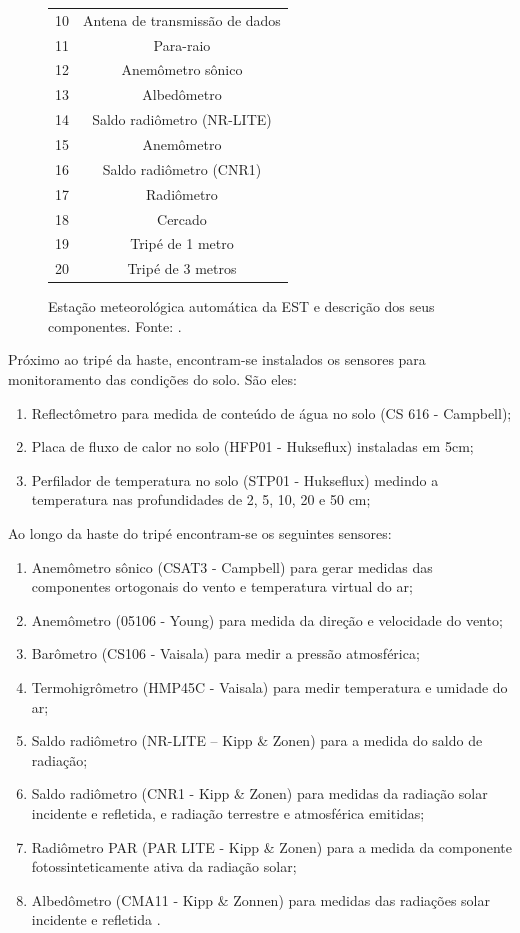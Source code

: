 \begin{figure}
\begin{minipage}{\textwidth}
\begin{minipage}[b]{0.39\textwidth}
\begin{footnotesize}
\begin{tabular}{cc}
		10 & Antena de transmissão de dados\\
		11 & Para-raio\\
		12 & Anemômetro sônico\\
		13 & Albedômetro \\
		14 & Saldo radiômetro (NR-LITE)\\
		15 & Anemômetro\\
		16 & Saldo radiômetro (CNR1)\\
		17 & Radiômetro\\
		18 & Cercado \\
		19 & Tripé de 1 metro \\
		20 & Tripé de 3 metros\\
		\bottomrule
		\end{tabular}
	\end{footnotesize}
    \end{minipage}
  \end{minipage}
	\caption{Estação meteorológica automática da EST e descrição dos seus componentes. Fonte: \cite{Labinstru:EST}.}\label{fig:ema}
\end{figure}

Próximo ao tripé da haste, encontram-se instalados os sensores para monitoramento das condições do solo. São eles:
\begin{enumerate}
	\item Reflectômetro para medida de conteúdo de água no solo (CS 616 - Campbell);
	\item Placa de fluxo de calor no solo (HFP01 - Hukseflux) instaladas em 5cm;
	\item Perfilador de temperatura no solo (STP01 - Hukseflux) medindo a temperatura nas profundidades de 2, 5,   10, 20 e 50 cm;
\end{enumerate}

Ao longo da haste do tripé encontram-se os seguintes sensores:
\begin{enumerate}
	\item Anemômetro sônico (CSAT3 - Campbell) para gerar medidas das componentes ortogonais do vento e temperatura virtual do ar;
	\item Anemômetro (05106 - Young) para medida da direção e velocidade do vento;
	\item Barômetro (CS106 - Vaisala) para medir a pressão atmosférica;
	\item Termohigrômetro (HMP45C - Vaisala) para medir temperatura e umidade do ar;
	\item Saldo radiômetro (NR-LITE – Kipp \& Zonen) para a medida do saldo de radiação;
	\item Saldo radiômetro (CNR1 - Kipp \& Zonen) para medidas da radiação solar incidente e refletida, e radiação terrestre e atmosférica emitidas;
	\item Radiômetro PAR (PAR LITE - Kipp \& Zonen) para a medida da componente fotossinteticamente ativa da radiação solar;
	\item Albedômetro (CMA11 - Kipp \& Zonnen) para medidas das radiações solar incidente e refletida \cite{Labinstru:EST}.
\end{enumerate}

